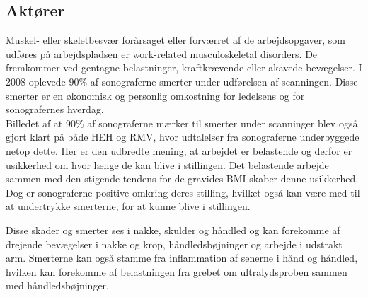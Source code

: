 \subsection{Aktører} \label{aktoerer_organisation}
Muskel- eller skeletbesvær forårsaget eller forværret af de arbejdsopgaver, som udføres på arbejdspladsen er work-related musculoskeletal disorders. De fremkommer ved gentagne belastninger, kraftkrævende eller akavede bevægelser. I 2008 oplevede 90\% af sonograferne smerter under udførelsen af scanningen. Disse smerter er en økonomisk og personlig omkostning for ledelsens og for sonografernes hverdag. \cite{31}\cite{30}\\
Billedet af at 90\% af sonograferne mærker til smerter under scanninger blev også gjort klart på både HEH og RMV, hvor udtalelser fra sonograferne underbyggede netop dette. Her er den udbredte mening, at arbejdet er belastende og derfor er usikkerhed om hvor længe de kan blive i stillingen. Det belastende arbejde sammen med den stigende tendens for de gravides BMI skaber denne usikkerhed. Dog er sonograferne positive omkring deres stilling, hvilket også kan være med til at undertrykke smerterne, for at kunne blive i stillingen.

Disse skader og smerter ses i nakke, skulder og håndled og kan forekomme af drejende bevægelser i nakke og krop, håndledsbøjninger og arbejde i udstrakt arm. Smerterne kan også stamme fra inflammation af senerne i hånd og håndled, hvilken kan forekomme af belastningen fra grebet om ultralydsproben sammen med håndledsbøjninger. \cite{31}

